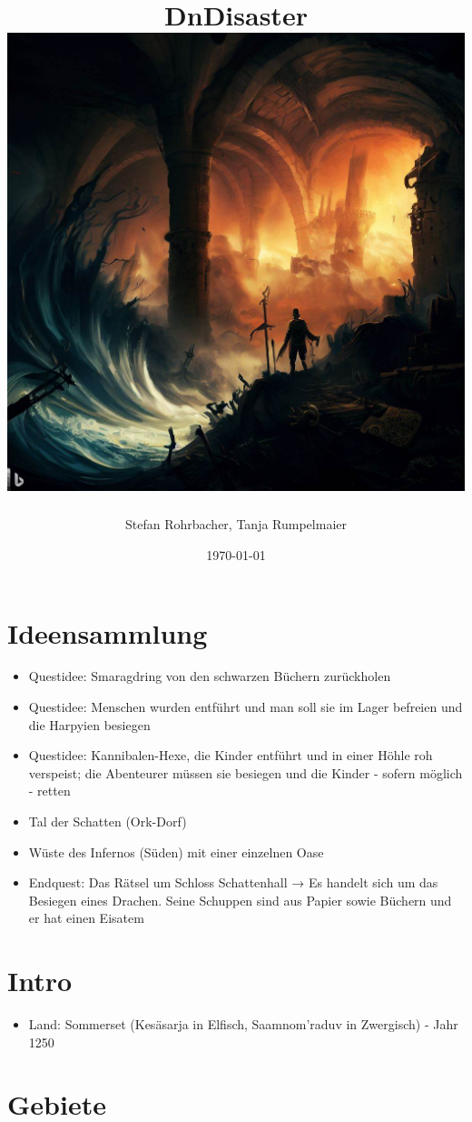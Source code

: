 \documentclass[11pt, twoside]{article}
\author{Stefan Rohrbacher, Tanja Rumpelmaier}
\date{\today}
\title{DnDisaster\\\medskip
\large \includegraphics[width=\linewidth]{wallpaper1.jpeg}}
\begin{document}
\maketitle
\tableofcontents

\newpage

\section{Ideensammlung}
\label{sec:orgeade7f1}
\begin{itemize}
\item Questidee: Smaragdring von den schwarzen Büchern zurückholen
\item Questidee: Menschen wurden entführt und man soll sie im Lager befreien und die Harpyien besiegen
\item Questidee: Kannibalen-Hexe, die Kinder entführt und in einer Höhle roh verspeist; die Abenteurer müssen sie besiegen und die Kinder - sofern möglich - retten
\item Tal der Schatten (Ork-Dorf)
\item Wüste des Infernos (Süden) mit einer einzelnen Oase
\item Endquest: Das Rätsel um Schloss Schattenhall → Es handelt sich um das Besiegen eines Drachen. Seine Schuppen sind aus Papier sowie Büchern und er hat einen Eisatem
\end{itemize}


\section{Intro}
\label{sec:org9a23ca9}
\begin{itemize}
\item Land: Sommerset (Kesäsarja in Elfisch, Saamnom’raduv in Zwergisch) - Jahr 1250
\end{itemize}

\section{Gebiete}
\label{sec:orgaf9038a}
\end{document}
